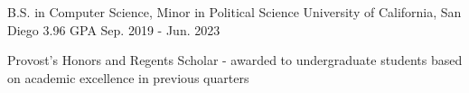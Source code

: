 

\begin{cventries}

    \cventry
    {B.S. in Computer Science, Minor in Political Science} %
    {University of California, San Diego} %
    {3.96 GPA} %
    {Sep. 2019 - Jun. 2023} %
    {
      \begin{cvitems} %
        \item {Provost's Honors and Regents Scholar - awarded to undergraduate students based on academic excellence in previous quarters}
      \end{cvitems}
    }

\end{cventries}
